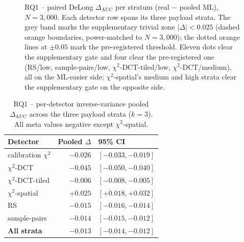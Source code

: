 \documentclass[10pt,twocolumn,a4paper]{article}
\begin{document}
\begin{figure}[t]
\caption{RQ1 -- paired DeLong $\Delta_\text{AUC}$ per stratum (real $-$ pooled ML), $N\!=\!3{,}000$. Each detector row spans its three payload strata. The grey band marks the supplementary trivial zone $|\Delta|\!<\!0.025$ (dashed orange boundaries, power-matched to $N\!=\!3{,}000$); the dotted orange lines at $\pm 0.05$ mark the pre-registered threshold. Eleven dots clear the supplementary gate and four clear the pre-registered one (RS/low, sample-pairs/low, $\chi^2$-DCT-tiled/low, $\chi^2$-DCT/medium), all on the ML-easier side; $\chi^2$-spatial's medium and high strata clear the supplementary gate on the opposite side.}
\label{fig:rq1strip}
\end{figure}

\begin{table}[t]
\centering\small
\caption{RQ1 -- per-detector inverse-variance pooled $\Delta_\text{AUC}$ across the three payload strata ($k\!=\!3$). All meta values negative except $\chi^2$-spatial.}
\label{tab:rq1meta}
\setlength{\tabcolsep}{5pt}\renewcommand{\arraystretch}{1.1}
\begin{tabular}{@{}l r l@{}}
\toprule
\textbf{Detector} & \textbf{Pooled $\Delta$} & \textbf{95\% CI} \\
\midrule
calibration $\chi^2$    & $-0.026$ & $[-0.033, -0.019]$ \\
$\chi^2$-DCT            & $-0.045$ & $[-0.050, -0.040]$ \\
$\chi^2$-DCT-tiled      & $-0.006$ & $[-0.008, -0.005]$ \\
$\chi^2$-spatial        & $+0.025$ & $[+0.018, +0.032]$ \\
RS                      & $-0.015$ & $[-0.016, -0.014]$ \\
sample-pairs            & $-0.014$ & $[-0.015, -0.012]$ \\
\midrule
\textbf{All strata}     & $\boldsymbol{-0.013}$ & $\boldsymbol{[-0.014, -0.012]}$ \\
\bottomrule
\end{tabular}
\end{table}
\end{document}
